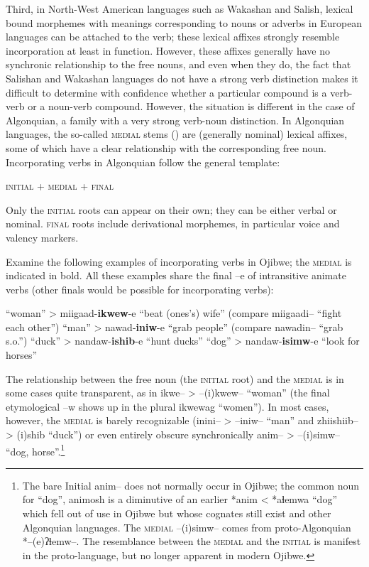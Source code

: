 \documentclass[oldfontcommands,oneside,a4paper,11pt]{article}
\newcommand{\ipa}[1]{{\phon #1}} %
\begin{document}
Third,  in North-West American languages such as Wakashan and Salish, lexical bound morphemes with meanings corresponding to nouns or adverbs in European languages can be attached to the verb; these lexical affixes strongly resemble incorporation at least in function. However, these affixes generally have no synchronic relationship to the free nouns, and even when they do, the fact that Salishan and Wakashan languages do not have a strong verb distinction makes it difficult to determine with confidence whether a particular compound is a verb-verb or a noun-verb compound. However, the situation is different in the case of Algonquian, a family with a very strong verb-noun distinction. In Algonquian languages, the so-called \textsc{medial} stems (\citealt{goddard90stems}) are  (generally nominal) lexical affixes, some of which have a clear relationship with the corresponding free noun. Incorporating verbs in Algonquian follow the general template:
 \begin{exe}
\ex
   \glt \textsc{initial} + \textsc{medial} + \textsc{final}
\end{exe} 
Only the \textsc{initial} roots can appear on their own; they can be either verbal or nominal. \textsc{final} roots include derivational morphemes, in particular voice and valency markers.

Examine the following examples of incorporating verbs in Ojibwe; the \textsc{medial} is indicated in bold. All these examples share the final --\ipa{e} of intransitive animate verbs (other finals would be possible for incorporating verbs):

 \begin{exe}
\ex
   \glt  \ipa{ikwe--} ``woman'' > \ipa{miigaad-\textbf{ikwew}-e} ``beat (ones's) wife'' (compare \ipa{miigaadi--} ``fight each other'')
 \glt   \ipa{inini--} ``man'' > \ipa{nawad-\textbf{iniw}-e} ``grab people'' (compare \ipa{nawadin--} ``grab s.o.'')
 \glt  \ipa{zhiishiib--} ``duck'' > \ipa{nandaw-\textbf{ishib}-e} ``hunt ducks''
  \glt  \ipa{anim--} ``dog'' > \ipa{nandaw-\textbf{isimw}-e} ``look for horses''
  
\end{exe} 
The relationship between the free noun (the \textsc{initial} root) and the \textsc{medial} is in some cases quite transparent, as in \ipa{ikwe--} > \ipa{--(i)kwew--} ``woman'' (the final etymological --\ipa{w} shows up in the plural \ipa{ikwewag} ``women''). 
In most cases, however, the \textsc{medial} is barely recognizable (\ipa{inini--} > \ipa{--iniw--} ``man'' and \ipa{zhiishiib--}  > \ipa{(i)shib} ``duck'') or even entirely obscure synchronically \ipa{anim--}  > \ipa{--(i)simw--} ``dog, horse''.\footnote{The bare Initial  \ipa{anim--} does not normally occur in Ojibwe; the common noun for ``dog'', \ipa{animosh} is a diminutive of an earlier *anim < *aɬemwa ``dog'' which fell out of use in Ojibwe but whose cognates still exist and other Algonquian languages. The \textsc{medial}  \ipa{--(i)simw--} comes from proto-Algonquian *--(e)ʔɬemw--. The resemblance between the \textsc{medial} and the \textsc{initial} is manifest in the proto-language, but no longer apparent in modern Ojibwe.} 
\end{document}
